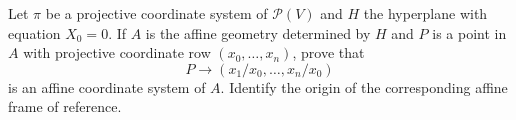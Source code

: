 Let $\pi$ be a projective coordinate system of $\mathcal{P}(V)$ and $H$ the hyperplane with equation $X_0 = 0$. If $A$ is the affine geometry determined by $H$ and $P$ is a point in $A$ with projective coordinate row $(x_0, \ldots, x_n)$, prove that
$$P \rightarrow (x_1/x_0, \ldots, x_n/x_0)$$
is an affine coordinate system of $A$. Identify the origin of the corresponding affine frame of reference.
